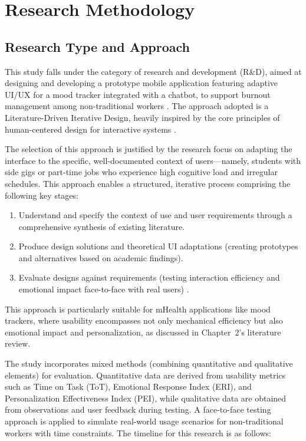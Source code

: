 \chapter{Research Methodology}

\section{Research Type and Approach}

This study falls under the category of research and development (R\&D), aimed at designing and developing a prototype mobile application featuring adaptive UI/UX for a mood tracker integrated with a chatbot, to support burnout management among non-traditional workers \cite{sugiyono2019metodologi}. The approach adopted is a Literature-Driven Iterative Design, heavily inspired by the core principles of human-centered design for interactive systems \cite{iso9241210}.

The selection of this approach is justified by the research focus on adapting the interface to the specific, well-documented context of users---namely, students with side gigs or part-time jobs who experience high cognitive load and irregular schedules. This approach enables a structured, iterative process comprising the following key stages:

\begin{enumerate}
    \item Understand and specify the context of use and user requirements through a comprehensive synthesis of existing literature.
    \item Produce design solutions and theoretical UI adaptations (creating prototypes and alternatives based on academic findings).
    \item Evaluate designs against requirements (testing interaction efficiency and emotional impact face-to-face with real users) \cite{norman2013design}.
\end{enumerate}

This approach is particularly suitable for mHealth applications like mood trackers, where usability encompasses not only mechanical efficiency but also emotional impact and personalization, as discussed in Chapter~2's literature review.

The study incorporates mixed methods (combining quantitative and qualitative elements) for evaluation. Quantitative data are derived from usability metrics such as Time on Task (ToT), Emotional Response Index (ERI), and Personalization Effectiveness Index (PEI), while qualitative data are obtained from observations and user feedback during testing. A face-to-face testing approach is applied to simulate real-world usage scenarios for non-traditional workers with time constraints. The timeline for this research is as follows:

